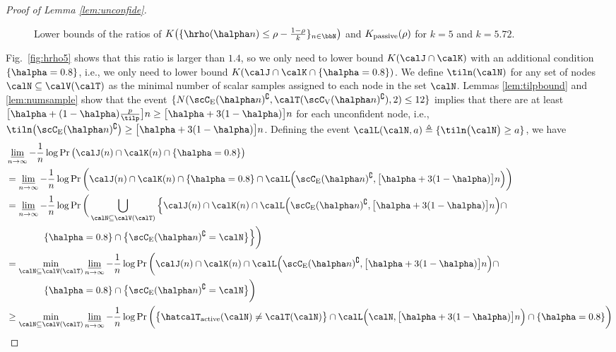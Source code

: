 \documentclass[11pt,onecolumn]{article}
\newcommand{\Passive}{{\rm passive}}
\newcommand{\Active}{{\rm active}}
\begin{document}
\begin{proof}[Proof of Lemma \ref{lem:unconfide}]
\begin{figure}[t]
{		}%
		\centering
		\caption{Lower bounds of the ratios of $K\big(\{\hrho(\halpha n)\leq \rho-\frac{1-\rho}{k}\}_{n\in\bbN}\big)$ and $K_{\Passive}(\rho)$ for $k=5$ and $k=5.72$.}
	\end{figure}
	Fig.~\ref{fig:hrho5} shows that this ratio is larger than $1.4$, so we only need to lower bound $K(\calJ\cap \calK)$ with an additional condition $\{\halpha =0.8\}$, i.e., we only need to lower bound $K(\calJ\cap \calK\cap\{ \halpha=0.8\})$. We define $\tiln (\calN)$ for any set of nodes $\calN\subseteq \calV(\calT)$ as the minimal number of scalar samples assigned to 
	each node in the set $\calN$. Lemmas \ref{lem:tilpbound} and \ref{lem:numsample} show that the event $\{N(\scC_{\mathrm{E}}(\halpha n)^{\complement},\calT(\scC_{\mathrm{V}}(\halpha n)^{\complement}),2)\leq 12\}$ implies that there are at least $\big[\halpha+(1-\halpha)\frac{p}{\tilp}\big]n\geq \big[\halpha+3(1-\halpha)\big]n$ for each 
	unconfident node, i.e., $\tiln \big(\scC_{\mathrm{E}}(\halpha n)^{\complement}\big)\geq \big[\halpha+3(1-\halpha)\big]n$. Defining the event $\calL(\calN,a) \triangleq \{\tiln \big(\calN \big)\geq a\}$, we have
	\begin{align}
		&\varliminf_{n\rightarrow\infty}-\frac{1}{n}\log\Pr\big(\calJ(n)\cap \calK(n)\cap\{ \halpha=0.8\}\big)\nonumber\\*
		&=\varliminf_{n\rightarrow\infty}-\frac{1}{n}\log\Pr\bigg(\calJ(n)\cap \calK(n)\cap\{ \halpha=0.8\}\cap \calL\Big(\scC_{\mathrm{E}}(\halpha n)^{\complement},\big[\halpha+3(1-\halpha)\big]n\Big)\bigg)\label{unconf:eq1}\\
		&=\varliminf_{n\rightarrow\infty}-\frac{1}{n}\log\Pr\bigg(\bigcup_{\calN\subseteq \calV(\calT)} \Big\{\calJ(n)\cap \calK(n)\cap \calL\Big(\scC_{\mathrm{E}}(\halpha n)^{\complement},\big[\halpha+3(1-\halpha)\big]n\Big) \cap\nonumber\\*
		&\qquad\qquad \{ \halpha=0.8\} \cap\big\{\scC_{\mathrm{E}}(\halpha n)^{\complement}=\calN\big\}\Big\}\bigg)\\
		&=\min_{\calN\subseteq \calV(\calT)}\varliminf_{n\rightarrow\infty}-\frac{1}{n}\log\Pr\bigg(\calJ(n)\cap \calK(n)\cap \calL\Big(\scC_{\mathrm{E}}(\halpha n)^{\complement},\big[\halpha+3(1-\halpha)\big]n\Big) \cap\nonumber\\*
		&\qquad\qquad\{ \halpha=0.8\} \cap\big\{\scC_{\mathrm{E}}(\halpha n)^{\complement}=\calN\big\}\bigg)\label{unconf:ieq1}\\
		&\geq \min_{\calN\subseteq \calV(\calT)}\varliminf_{n\rightarrow\infty}-\frac{1}{n}\log\Pr\bigg(\big\{\hatcalT_{\Active}(\calN)\neq\calT(\calN)\big\}\cap \calL\Big(\calN,\big[\halpha+3(1-\halpha)\big]n\Big) \cap \{ \halpha=0.8\}\bigg)\\

\end{align}
\end{proof}
\end{document}

